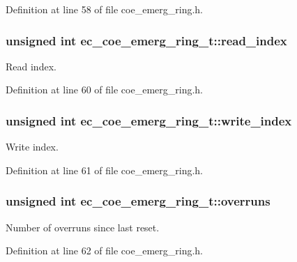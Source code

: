 \-Definition at line 58 of file coe\-\_\-emerg\-\_\-ring.\-h.

\subsubsection[{read\-\_\-index}]{\setlength{\rightskip}{0pt plus 5cm}unsigned int {\bf ec\-\_\-coe\-\_\-emerg\-\_\-ring\-\_\-t\-::read\-\_\-index}}\label{structec__coe__emerg__ring__t_a80d30a36f0afa019ff6c30b0b9bb0cbe}


\-Read index. 



\-Definition at line 60 of file coe\-\_\-emerg\-\_\-ring.\-h.

\subsubsection[{write\-\_\-index}]{\setlength{\rightskip}{0pt plus 5cm}unsigned int {\bf ec\-\_\-coe\-\_\-emerg\-\_\-ring\-\_\-t\-::write\-\_\-index}}\label{structec__coe__emerg__ring__t_ad4f4b63ee5489b89404912b1780fcf8a}


\-Write index. 



\-Definition at line 61 of file coe\-\_\-emerg\-\_\-ring.\-h.

\subsubsection[{overruns}]{\setlength{\rightskip}{0pt plus 5cm}unsigned int {\bf ec\-\_\-coe\-\_\-emerg\-\_\-ring\-\_\-t\-::overruns}}\label{structec__coe__emerg__ring__t_a108ec818f8a5411a67fd78731b1e6c9b}


\-Number of overruns since last reset. 



\-Definition at line 62 of file coe\-\_\-emerg\-\_\-ring.\-h.

